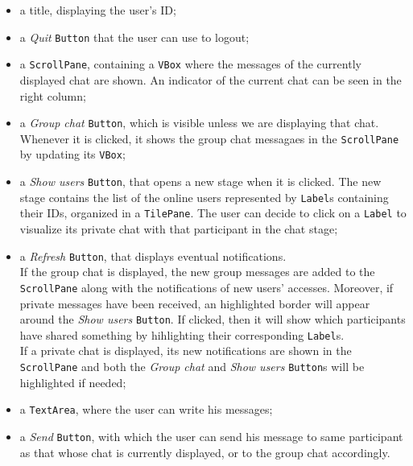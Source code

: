 \documentclass[12pt]{article}
\begin{document}
\begin{itemize}
    \item a title, displaying the user's ID;
    \item a {\em Quit} \texttt{Button} that the user can use to logout;
    \item a \texttt{ScrollPane}, containing a \texttt{VBox} where the messages of the currently displayed chat are shown. An indicator of the current chat can be seen in the right column;
    \item a {\em Group chat} \texttt{Button}, which is visible unless we are displaying that chat. Whenever it is clicked, it shows the group chat messagaes in the \texttt{ScrollPane} by updating its \texttt{VBox};
    \item a {\em Show users} \texttt{Button}, that opens a new stage when it is clicked. The new stage contains the list of the online users represented by \texttt{Label}s containing their IDs, organized in a \texttt{TilePane}. The user can decide to click on a \texttt{Label} to visualize its private chat with that participant in the chat stage;
    \item a {\em Refresh} \texttt{Button}, that displays eventual notifications. \\ If the group chat is displayed, the new group messages are added to the \texttt{ScrollPane} along with the notifications of new users' accesses. Moreover, if private messages have been received, an highlighted border will appear around the {\em Show users} \texttt{Button}. If clicked, then it will show which participants have shared something by hihlighting their corresponding \texttt{Label}s. \\ If a private chat is displayed, its new notifications are shown in the \texttt{ScrollPane} and both the {\em Group chat} and {\em Show users} \texttt{Button}s will be highlighted if needed;
    \item a \texttt{TextArea}, where the user can write his messages;
    \item a {\em Send} \texttt{Button}, with which the user can send his message to same participant as that whose chat is currently displayed, or to the group chat accordingly.
\end{itemize}
\end{document}
